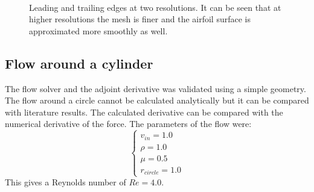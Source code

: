 \documentclass[12pt, a4paper]{article}
\begin{document}
\begin{figure}[htbp]
    \centering
     \qquad
     \\
     \qquad
    \caption{Leading and trailing edges at two resolutions. It can be seen that at higher resolutions the mesh is finer and the airfoil surface is approximated more smoothly as well.}
    \label{fig_mesh_edges}
\end{figure}

\subsection{Flow around a cylinder}
The flow solver and the adjoint derivative was validated using a simple geometry. The flow around a circle cannot be calculated analytically but it can be compared with literature results. The calculated derivative can be compared with the numerical derivative of the force. The parameters of the flow were:
\begin{equation}
\begin{cases}
v_{in} = 1.0 \\
\rho = 1.0 \\
\mu = 0.5 \\
r_{circle} = 1.0
\end{cases}
\end{equation}
This gives a Reynolds number of $Re = 4.0$.
\end{document}
